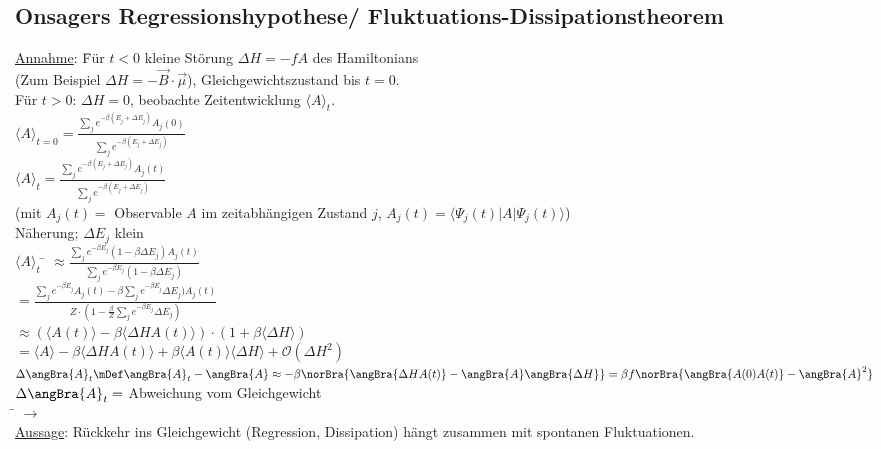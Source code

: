 \subsection{Onsagers Regressionshypothese/ Fluktuations-Dissipationstheorem}
\begin{tabbing}
\underline{Annahme}: \= Für $t < 0$ kleine Störung $\Delta H = - f A$ des Hamiltonians\\
\> (Zum Beispiel $\Delta H  = - \vec{B}\cdot \vec{\mu}$), Gleichgewichtszustand bis $t=0$.\\
\> Für $t > 0$: $\Delta H = 0$, beobachte Zeitentwicklung $\langle A \rangle_t$.\\
$\langle A \rangle_{t = 0} = \frac{\sum\limits_j e^{-\beta(E_j + \Delta E_j)}A_j(0)}{\sum\limits_j e^{-\beta(E_j + \Delta E_j)}}$\\
$\langle A \rangle_{t} = \frac{\sum\limits_j e^{-\beta(E_j + \Delta E_j)}A_j(t)}{\sum\limits_j e^{-\beta(E_j + \Delta E_j)}}$\\
(mit $A_j(t)=$ Observable $A$ im zeitabhängigen Zustand $j$, $A_j(t) = \langle \Psi_j(t)|A|\Psi_j(t)\rangle$)\\
Näherung; $\Delta E_j$ klein\\
$\langle A \rangle_t$ \= $\approx \frac{\sum\limits_j e^{-\beta E_j}(1 - \beta \Delta E_j) A_j(t)}{\sum\limits_j e^{-\beta E_j}(1-\beta \Delta E_j)}$\\
\> $= \frac{\sum\limits_j e^{-\beta E_j}A_j(t) -\beta\sum\limits_j e^{-\beta E_j} \Delta E_j) A_j(t)}{Z\cdot\left(1 - \frac{\beta}{Z}\sum\limits_j e^{-\beta E_j}\Delta E_j\right)}$\\
\> $\approx \left(\langle A(t)\rangle - \beta \langle\Delta H A(t)\rangle \right)\cdot (1 + \beta\langle \Delta H\rangle)$\\
\> $= \langle A \rangle - \beta\langle\Delta H A(t)\rangle + \beta \langle A(t) \rangle\langle \Delta H\rangle + \mathcal{O}\left(\Delta H^2\right)$\\
$\Delta\angBra{A}_t \mDef \angBra{A}_t - \angBra{A} \approx - \beta \norBra{\angBra{\Delta H A(t)}- \angBra{A}\angBra{\Delta H}} = \beta f \norBra{\angBra{A(0)A(t)}-\angBra{A}^2}$\\
$\Delta \angBra{A}_t =$ Abweichung vom Gleichgewicht\\
\hspace{4em} \= \kill
$\rightarrow$\> \\
\underline{Aussage}: Rückkehr ins Gleichgewicht (Regression, Dissipation) hängt zusammen mit spontanen Fluktuationen.
\end{tabbing}

